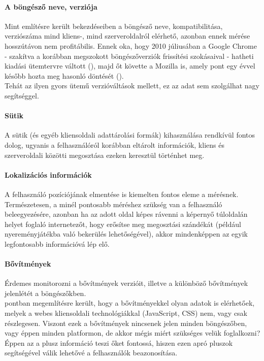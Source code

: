 \paragraph{A böngésző neve, verziója} %
\label{par:a_böngésző_neve_verziója}
Mint említésre került  bekezdéseiben a böngésző neve, kompatibilitása, verziószáma mind kliens-, mind szerveroldalról elérhető, azonban ennek mérése hosszútávon nem profitábilis. Ennek oka, hogy 2010 júliusában a Google Chrome - szakítva a korábban megszokott böngészőverziók frissítési szokásaival - hatheti kiadási ütemtervre váltott (\cite{chrome_six_weeks}), majd őt követte a Mozilla is, amely pont egy évvel később hozta meg hasonló döntését (\cite{mozilla_six_weeks}).\hfill\\
Tehát az ilyen gyors ütemű verzióváltások mellett, ez az adat sem szolgálhat nagy segítséggel.

\paragraph{Sütik} %
\label{par:sütik}
A sütik (és egyéb kliensoldali adattárolási formák) kihasználása rendkívül fontos dolog, ugyanis a felhasználóról korábban eltárolt információk, kliens és szerveroldali közötti megosztása ezeken keresztül történhet meg.

\paragraph{Lokalizációs információk} %
\label{par:lokalizációs_információk}
A felhasználó pozíciójának elmentése is kiemelten fontos eleme a mérésnek. Természetesen, a minél pontosabb méréshez szükség van a felhasználó beleegyezésére, azonban ha az adott oldal képes rávenni a képernyő túloldalán helyet foglaló internetezőt, hogy erősítse meg megosztási szándékát (például nyereményjátékba való bekerülés lehetőségével), akkor mindenképpen az egyik legfontosabb információvá lép elő.

\paragraph{Bővítmények} %
\label{par:bővítmények}
Érdemes monitorozni a bővítmények verzióit, illetve a különböző bővítmények jelenlétét a böngészőkben.\hfill\\
 pontban megemlítésre került, hogy a bővítményekkel olyan adatok is elérhetőek, melyek a webes kliensoldali technológiákkal (JavaScript, CSS) nem, vagy csak részlegesen. Viszont ezek a bővítmények nincsenek jelen minden böngészőben, vagy éppen minden platformon, de akkor mégis miért szükséges velük foglalkozni?\hfill\\
Éppen az a plusz információ teszi őket fontossá, hiszen ezen apró pluszok segítségével válik lehetővé a felhasználók beazonosítása.
